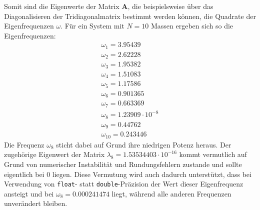 Somit sind die Eigenwerte der Matrix $\mathbf{A}$, die beispielsweise über das Diagonalisieren der Tridiagonalmatrix bestimmt werden können, die Quadrate der Eigenfrequenzen $\omega$.
Für ein System mit $N=10$ Massen ergeben sich so die Eigenfrequenzen:
\begin{align*}
   \omega_1 = 3.95439\\
   \omega_2 = 2.62228\\
   \omega_3 = 1.95382\\
   \omega_4 = 1.51083\\
   \omega_5 = 1.17586\\
   \omega_6 = 0.901365\\
   \omega_7 = 0.663369\\
   \omega_8 = 1.23909\cdot 10^{-8}\\
   \omega_9 = 0.44762\\
   \omega_10 = 0.243446
\end{align*}
Die Frequenz $\omega_8$ sticht dabei auf Grund ihre niedrigen Potenz heraus. Der zugehörige Eigenwert der Matrix $\lambda_8 = 1.53534403\cdot 10^{-16}$ kommt vermutlich auf Grund von numerischer Instabilität und Rundungsfehlern zustande und sollte eigentlich bei $0$ liegen. Diese Vermutung wird auch dadurch unterstützt, dass bei Verwendung von \texttt{float}- statt \texttt{double}-Präzision der Wert dieser Eigenfrequenz ansteigt und bei $\omega_8 = 0.000241474$ liegt, während alle anderen Frequenzen unverändert bleiben.
